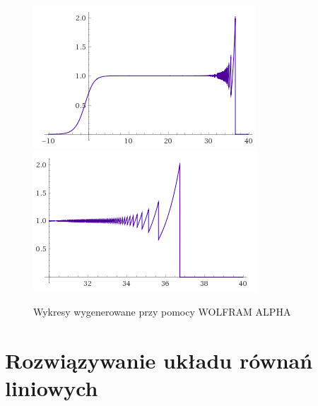 \documentclass{article}
\begin{document}
            \begin{figure}
                \centering                 \includegraphics[width=\textwidth]{wolfram_-10_40.png}
                \includegraphics[width=\textwidth]{wolfram_30_40.png}
                \caption{Wykresy wygenerowane przy pomocy WOLFRAM ALPHA}
                \label{fig:wolfram}
            \end{figure}
    \section{Rozwiązywanie układu równań liniowych}
\end{document}

